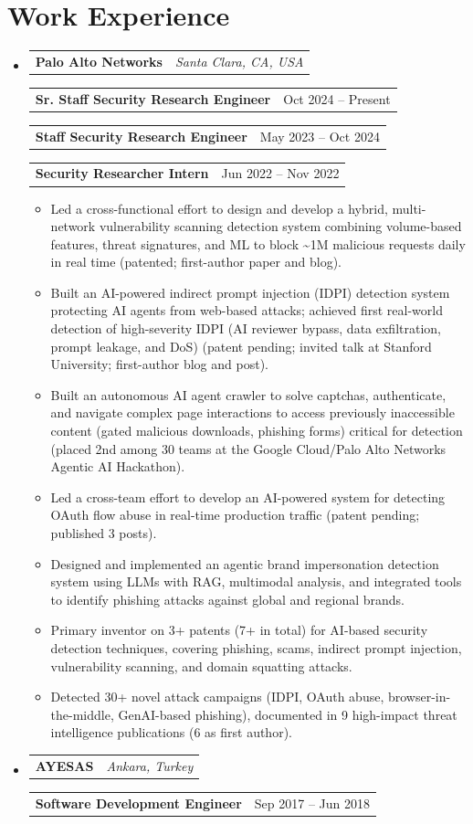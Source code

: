 \documentclass[letterpaper,11pt]{article}
\makeatletter
\newcommand{\resumeCompanyHeading}[2]{
  \vspace{-2pt}\item
    \begin{tabular*}{1.0\textwidth}[t]{l@{\extracolsep{\fill}}r}
      \textbf{\small #1} & \textit{\small #2} \\
    \end{tabular*}\vspace{-1pt}
}
\newcommand{\resumePositionHeading}[2]{
  \vspace{3pt}
    \begin{tabular*}{1.0\textwidth}[t]{l@{\extracolsep{\fill}}r}
      \textbf{\small #1} & {\small #2} \\
    \end{tabular*}\vspace{-3pt}
}
\newcommand{\resumeSubHeadingListStart}{\begin{itemize}[leftmargin=0.0in, label={}]}
\newcommand{\resumeSubHeadingListEnd}{\end{itemize}}
\makeatother
\begin{document}
\section{Work Experience}
  \resumeSubHeadingListStart
    \resumeCompanyHeading
      {Palo Alto Networks}{Santa Clara, CA, USA}
    \resumePositionHeading
      {Sr. Staff Security Research Engineer}{Oct 2024 -- Present}
    \resumePositionHeading
      {Staff Security Research Engineer}{May 2023 -- Oct 2024}
    \resumePositionHeading
      {Security Researcher Intern}{Jun 2022 -- Nov 2022}
      \begin{itemize}[leftmargin=0.2in, label={$\bullet$}, topsep=0pt]
        \item \small Led a cross-functional effort to design and develop a hybrid, multi-network vulnerability scanning detection system combining volume-based features, threat signatures, and ML to block \textasciitilde1M malicious requests daily in real time (patented; first-author paper and blog).
        \item \small Built an AI-powered indirect prompt injection (IDPI) detection system protecting AI agents from web-based attacks; achieved first real-world detection of high-severity IDPI (AI reviewer bypass, data exfiltration, prompt leakage, and DoS) (patent pending; invited talk at Stanford University; first-author blog and post).
        \item \small Built an autonomous AI agent crawler to solve captchas, authenticate, and navigate complex page interactions to access previously inaccessible content (gated malicious downloads, phishing forms) critical for detection (placed 2nd among 30 teams at the Google Cloud/Palo Alto Networks Agentic AI Hackathon).
        \item \small Led a cross-team effort to develop an AI-powered system for detecting OAuth flow abuse in real-time production traffic (patent pending; published 3 posts).
        \item \small Designed and implemented an agentic brand impersonation detection system using LLMs with RAG, multimodal analysis, and integrated tools to identify phishing attacks against global and regional brands.
        \item \small Primary inventor on 3+ patents (7+ in total) for AI-based security detection techniques, covering phishing, scams, indirect prompt injection, vulnerability scanning, and domain squatting attacks.
        \item \small Detected 30+ novel attack campaigns (IDPI, OAuth abuse, browser-in-the-middle, GenAI-based phishing), documented in 9 high-impact threat intelligence publications (6 as first author).
      \end{itemize}
    \resumeCompanyHeading
      {AYESAS}{Ankara, Turkey}
    \resumePositionHeading
      {Software Development Engineer}{Sep 2017 -- Jun 2018}
  \resumeSubHeadingListEnd
\end{document}
